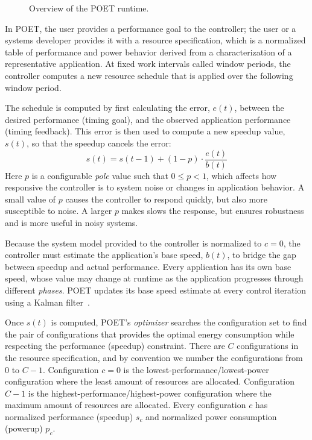 \begin{figure}[t]
  \begin{centering}
    
    \caption{Overview of the POET runtime.}
    \label{fig:poet-runtime}
  \end{centering}
\end{figure}

In POET, the user provides a performance goal to the controller; the user or a systems developer provides it with a resource specification, which is a normalized table of performance and power behavior derived from a characterization of a representative application.
At fixed work intervals called window periods, the controller computes a new resource schedule that is applied over the following window period.

The schedule is computed by first calculating the error, $e(t)$, between the desired performance (timing goal), and the observed application performance (timing feedback).
This error is then used to compute a new speedup value, $s(t)$, so that the speedup cancels the error:
\begin{equation}
  s(t) = s(t-1) + (1-p) \cdot \frac{e(t)}{b(t)} 
  \label{eqn:poet-control}
\end{equation}
Here $p$ is a configurable \emph{pole} value such that $0 \le p < 1$, which affects how responsive the controller is to system noise or changes in application behavior.
A small value of $p$ causes the controller to respond quickly, but also more susceptible to noise.
A larger $p$ makes slows the response, but ensures robustness and is more useful in noisy systems.

Because the system model provided to the controller is normalized to $c=0$, the controller must estimate the application's base speed, $b(t)$, to bridge the gap between speedup and actual performance.
Every application has its own base speed, whose value may change at runtime as the application progresses through different \emph{phases}.
POET updates its base speed estimate at every control iteration using a Kalman filter~\cite{welch2006kalman}.

Once $s(t)$ is computed, POET's \emph{optimizer} searches the configuration set to find the pair of configurations that provides the optimal energy consumption while respecting the performance (speedup) constraint.
There are $C$ configurations in the resource specification, and by convention we number the configurations from $0$ to $C-1$.
Configuration $c = 0$ is the lowest-performance/lowest-power configuration where the least amount of resources are allocated.
Configuration $C-1$ is the highest-performance/highest-power configuration where the maximum amount of resources are allocated.
Every configuration $c$ has normalized performance (speedup) $s_c$ and normalized power consumption (powerup) $p_c$.

